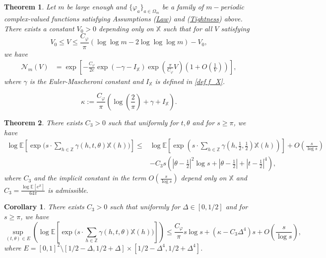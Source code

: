 \documentclass[10pt,a4paper]{amsart}
\newtheorem{thm}{Theorem}
\newtheorem{cor}{Corollary}
\def\E{\mathbb{E}}
\def\Mp{C_\varphi}
\def\Ncal{\mathcal{N}}
\def\X{\mathbb{X}}
\def\Z{\mathbb{Z}}
\begin{document}
\begin{thm}\label{THM Ncal_m(V)} Let $m$ be large enough and $\{\varphi_a\}_{a\in\Omega_m}$ be a family of $m-$periodic complex-valued functions satisfying Assumptions (\hyperlink{Ass Law}{Law}) and (\hyperlink{Ass Tightness}{Tightness}) above. There exists a constant $ V_0>0$ depending only on $\X$ such that for all \(V\) satisfying
\[ V_0\leq V \leq \frac{\Mp}{\pi} \left(
\log\log m-2\log\log\log m\right)-V_0,\] 
we have 
\begin{align*}
\Ncal_m(V)
&=
\exp\left[- \frac{\Mp}{2 e} \exp\left(-\gamma-I_\X \right)\exp\left(\frac{\pi }{\Mp}V\right)
\left(1+O\left(\frac{1}{V}\right)\right) \right],
\end{align*}
where $\gamma$ is the Euler-Mascheroni constant and  $
I_\X $ is defined in \eqref{def f_X}.

\end{thm}

\begin{equation}\label{def kappa}
\kappa :=\frac{\Mp}{\pi}
\left(\log\left(\frac{2}{\pi}\right)+\gamma+ I_\X \right).
\end{equation}

\begin{thm}\label{THM asymp t theta} There exists $C_3>0$ such that uniformly for $t, \theta$ and for $s\geq \pi$, we have
\begin{align*}
\log \E \left[\exp \Big(s \cdot \sum_{h\in \Z}
     \gamma(h,t,\theta)\X(h)\Big) \right] 
\leq & \log \E \left[\exp \left(s \cdot \sum_{h\in \Z} \gamma\left(h,\frac{1}{2},\frac{1}{2}\right)\X(h)\right)\right] + O\left(\frac{s}{\log s}\right)\\
    & - C_3 s\left(\left|\theta-\frac{1}{2}\right|^2 \log s +\left|\theta-\frac{1}{2}\right|+ \left|t-\frac{1}{2}\right|^4\right),
\end{align*} 
where $C_3$ and the implicit constant in the term $O\left(\frac{s}{\log s}\right)$ depend only on $\X$ and $C_3=\frac{\log\E\left[e^\X\right]}{64\pi }$ is admissible.
\end{thm}

\begin{cor}\label{Cor asymp T Theta} There exists $C_3>0$ such that uniformly for $\Delta \in [0,1/2]$ and for $s\geq \pi$, we have
\begin{equation}\label{eq unif asymp T Theta}
\sup_{(t,\theta) \in E}
\left(
\log 
\E \left[\exp \Big(s \cdot \sum_{h\in \Z}
     \gamma(h,t,\theta)\X(h)\Big) \right]
\right)
     \leq
     \frac{\Mp}{\pi} s \log s+(\kappa-C_3 \Delta^4) s+ O\left(\frac{s}{\log s }\right),
\end{equation}
where $E = [0,1]^2\setminus[1/2-\Delta,1/2+\Delta]\times[1/2-\Delta^4,1/2+\Delta^4]$.

\end{cor}
\end{document}
